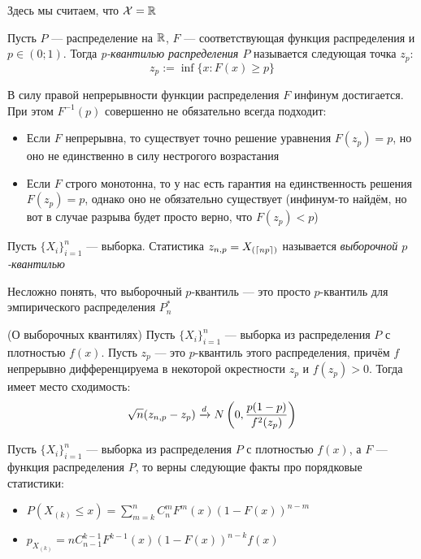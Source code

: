 \begin{note}
	Здесь мы считаем, что $\mathcal{X} = \mathbb{R}$
\end{note}

\begin{definition}
	Пусть $P$ --- распределение на $\mathbb{R}$, $F$ --- соответствующая функция распределения и $p \in (0; 1)$. Тогда \textit{p-квантилью распределения $P$} называется следующая точка $z_p$:
	\[
		z_p := \inf \{x \colon F(x) \ge p\}
	\]
\end{definition}

\begin{note}
	В силу правой непрерывности функции распределения $F$ инфинум достигается. При этом $F^{-1}(p)$ совершенно не обязательно всегда подходит:
	\begin{itemize}
		\item Если $F$ непрерывна, то существует точно решение уравнения $F(z_p) = p$, но оно не единственно в силу нестрогого возрастания
		
		\item Если $F$ строго монотонна, то у нас есть гарантия на единственность решения $F(z_p) = p$, однако оно не обязательно существует (инфинум-то найдём, но вот в случае разрыва будет просто верно, что $F(z_p) < p$)
	\end{itemize}
\end{note}

\begin{definition}
	Пусть $\{X_i\}_{i = 1}^n$ --- выборка. Статистика $z_{n, p} = X_{(\left\lceil np\right\rceil)}$ называется \textit{выборочной $p$-квантилью}
\end{definition}

\begin{note}
	Несложно понять, что выборочный $p$-квантиль --- это просто $p$-квантиль для эмпирического распределения $P_n^*$
\end{note}

\begin{theorem} (О выборочных квантилях)
	Пусть $\{X_i\}_{i = 1}^n$ --- выборка из распределения $P$ с плотностью $f(x)$. Пусть $z_p$ --- это $p$-квантиль этого распределения, причём $f$ непрерывно дифференцируема в некоторой окрестности $z_p$ и $f(z_p) > 0$. Тогда имеет место сходимость:
	\[
		\sqrt{n}(z_{n, p} - z_p) \xrightarrow{d} N\left(0, \frac{p(1 - p)}{f^2(z_p)}\right)
	\]
\end{theorem}

\begin{reminder}
	Пусть $\{X_i\}_{i = 1}^n$ --- выборка из распределения $P$ с плотностью $f(x)$, а $F$ --- функция распределения $P$, то верны следующие факты про порядковые статистики:
	\begin{itemize}
		\item $P(X_{(k)} \le x) = \sum_{m = k}^n C_n^m F^m(x)(1 - F(x))^{n - m}$
		
		\item $p_{X_{(k)}} = n C_{n - 1}^{k - 1} F^{k - 1}(x)(1 - F(x))^{n - k}f(x)$
	\end{itemize}
\end{reminder}

